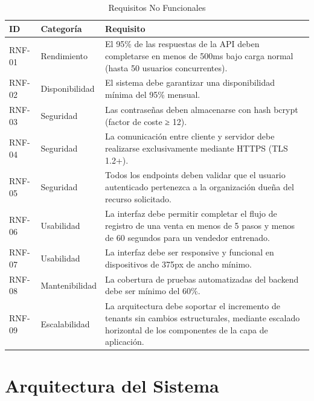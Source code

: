 \begin{longtable}[]{@{}
  >{\raggedright\arraybackslash}p{}
  >{\raggedright\arraybackslash}p{}
  >{\raggedright\arraybackslash}p{}@{}}
\caption[Requisitos No Funcionales]{Requisitos No Funcionales}\tabularnewline
\toprule\noalign{}
\begin{minipage}[b]{\linewidth}\raggedright
ID
\end{minipage} & \begin{minipage}[b]{\linewidth}\raggedright
Categoría
\end{minipage} & \begin{minipage}[b]{\linewidth}\raggedright
Requisito
\end{minipage} \\
\midrule\noalign{}
\endhead
\bottomrule\noalign{}
\endlastfoot
RNF-01 & Rendimiento & El 95\% de las respuestas de la API deben completarse en menos de 500ms bajo carga normal (hasta 50 usuarios concurrentes). \\
RNF-02 & Disponibilidad & El sistema debe garantizar una disponibilidad mínima del 95\% mensual. \\
RNF-03 & Seguridad & Las contraseñas deben almacenarse con hash bcrypt (factor de coste ≥ 12). \\
RNF-04 & Seguridad & La comunicación entre cliente y servidor debe realizarse exclusivamente mediante HTTPS (TLS 1.2+). \\
RNF-05 & Seguridad & Todos los endpoints deben validar que el usuario autenticado pertenezca a la organización dueña del recurso solicitado. \\
RNF-06 & Usabilidad & La interfaz debe permitir completar el flujo de registro de una venta en menos de 5 pasos y menos de 60 segundos para un vendedor entrenado. \\
RNF-07 & Usabilidad & La interfaz debe ser responsive y funcional en dispositivos de 375px de ancho mínimo. \\
RNF-08 & Mantenibilidad & La cobertura de pruebas automatizadas del backend debe ser mínimo del 60\%. \\
RNF-09 & Escalabilidad & La arquitectura debe soportar el incremento de tenants sin cambios estructurales, mediante escalado horizontal de los componentes de la capa de aplicación. \\
\end{longtable}

\section{Arquitectura del Sistema}\label{arquitectura-del-sistema}

